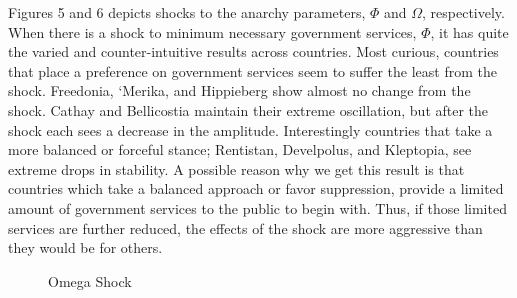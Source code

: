 \documentclass[12pt]{article}
\begin{document}
\begin{spacing}{1.5}
Figures 5 and 6 depicts shocks to the anarchy parameters, $\Phi$ and $\Omega$, respectively. When there is a shock to minimum necessary government services, $\Phi$, it has quite the varied and counter-intuitive results across countries. Most curious, countries that place a preference on government services seem to suffer the least from the shock. Freedonia, `Merika, and Hippieberg show almost no change from the shock. Cathay and Bellicostia maintain their extreme oscillation, but after the shock each sees a decrease in the amplitude. Interestingly countries that take a more balanced or forceful stance; Rentistan, Develpolus, and Kleptopia, see extreme drops in stability. A possible reason why we get this result is that countries which take a balanced approach or favor suppression, provide a limited amount of government services to the public to begin with. Thus, if those limited services are further reduced, the effects of the shock are more aggressive than they would be for others.     


\begin{figure}
\centering
\caption{Omega Shock}
\end{figure}


\end{spacing}
\end{document}
